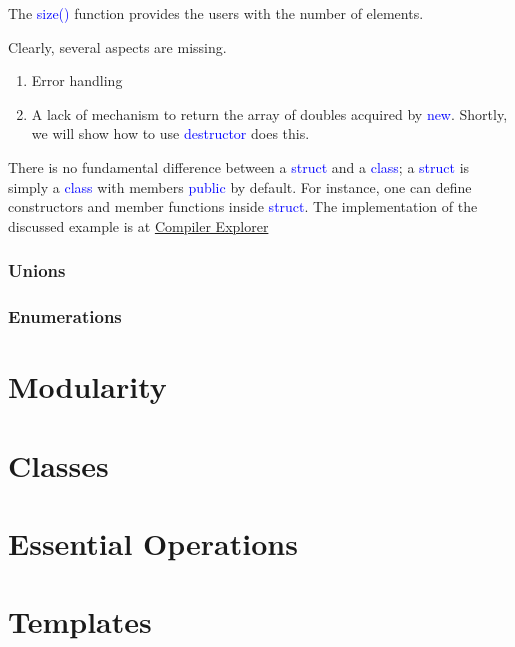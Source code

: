 \documentclass{article}
\newcommand{\be}[1]{\textcolor{blue}{#1}}
\begin{document}
The \be{size()} function provides the users with the number of elements.

Clearly, several aspects are missing.
\begin{enumerate}
	\item Error handling
	\item A lack of mechanism to return the array of doubles acquired by \be{new}. Shortly, we will show how to use \be{destructor} does this.
\end{enumerate}
There is no fundamental difference between a \be{struct} and a \be{class}; a \be{struct} is simply a \be{class} with members \be{public} by default. For instance, one can define constructors and member functions inside \be{struct}.
 The implementation of the discussed example is at 
\href{https://godbolt.org/z/E6M64s}{Compiler Explorer}
\subsubsection{Unions}


\subsubsection{Enumerations}
%

\section{Modularity}

\section{Classes}

\section{Essential Operations}

\section{Templates}
\end{document}
